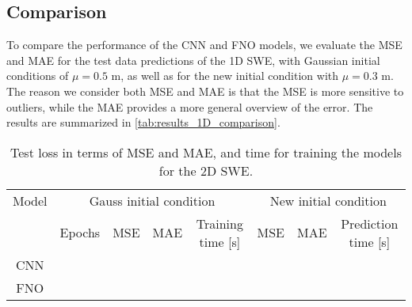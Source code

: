 \subsection*{Comparison}
To compare the performance of the CNN and FNO models, we evaluate the MSE and MAE for the test data predictions of the 1D SWE, with Gaussian initial conditions of $\mu = 0.5$ m, as well as for the new initial condition with $\mu = 0.3$ m.
The reason we consider both MSE and MAE is that the MSE is more sensitive to outliers, while the MAE provides a more general overview of the error.
The results are summarized in \autoref{tab:results_1D_comparison}.
\begin{table}[H]
    \centering
    \small %
    \begin{tabular}{c|cccc|ccc}
        Model & \multicolumn{4}{c|}{Gauss initial condition} & \multicolumn{3}{c}{New initial condition} \\
        \cline{2-8}
        & Epochs & MSE & MAE & Training time [s]  & MSE & MAE & Prediction time [s] \\
        \hline
        CNN  &
         &
         & 
         &
         &
         &
         &
         
        \\
        \hline
        FNO  &
         &
         &
         &
         &
         &
         &
        
        \\
        \hline
    \end{tabular}
    \caption{Test loss in terms of MSE and MAE, and time for training the models for the 2D SWE.}\label{tab:results_1D_comparison}
\end{table}
